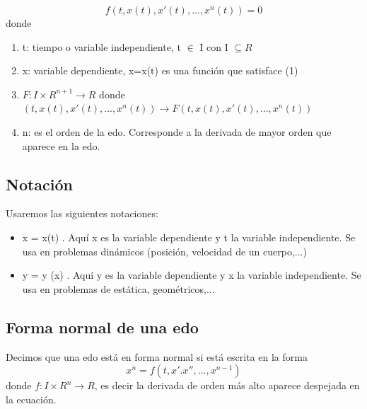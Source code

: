 \documentclass{book}
\begin{document}
    \begin{equation}
        f(t,x(t),x'(t),..., x^{n}(t))=0
    \end{equation}
    donde

    \begin{enumerate}
        \item t: tiempo o variable independiente, t $\in$ I con I $\subseteq  R$
        \item x: variable dependiente, x=x(t) es una función que satisface (1)
        \item $F: I \times R^{n+1} \rightarrow R$ donde\\ 
        $(t,x(t),x'(t),...,x^{n}(t)) \rightarrow  F(t,x(t),x'(t),...,x^{n}(t))$
         \item n: es el orden de la edo. Corresponde a la derivada de mayor orden que aparece
        en la edo.
    \end{enumerate}

    \subsection{Notación}

    Usaremos las siguientes notaciones:

    \begin{itemize}
        \item x = x(t) . Aquí x es la variable dependiente y t la variable independiente.
        Se usa en problemas dinámicos (posición, velocidad de un cuerpo,...)
        \item y = y (x) . Aquí y es la variable dependiente y x la variable independiente.
        Se usa en problemas de estática, geométricos,...
    \end{itemize}

    \subsection{Forma normal de una edo}

    Decimos que una edo está en forma normal si está escrita en la forma
    \begin{equation*}
        x^{n}=f(t,x'.x'',...,x^{n-1})
    \end{equation*}
    donde $f:I \times R^{n} \rightarrow R$, es decir la derivada de orden más alto aparece
    despejada en la ecuación.
\end{document}
